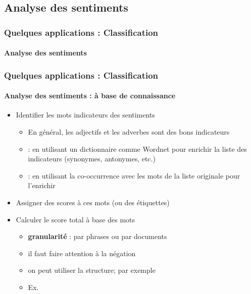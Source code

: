 \documentclass[xcolor=table]{beamer}
\begin{document}
\subsection{Analyse des sentiments}

\begin{frame}
	\frametitle{Quelques applications : Classification}
	\framesubtitle{Analyse des sentiments}
\end{frame}

\begin{frame}
	\frametitle{Quelques applications : Classification}
	\framesubtitle{Analyse des sentiments : à base de connaissance}
	
	\begin{itemize}
		\item Identifier les mots indicateurs des sentiments
		\begin{itemize}
			\item En général, les adjectifs et les adverbes sont des bons indicateurs
			\item {} : en utilisant un dictionnaire comme Wordnet pour enrichir la liste des indicateurs (synonymes, antonymes, etc.) 
			\item {} : en utilisant la co-occurrence avec les mots  de la liste originale pour l'enrichir 
		\end{itemize}
		\item Assigner des scores à ces mots (ou des étiquettes)
		\item Calculer le score total à  base des mots
		\begin{itemize}
			\item \textbf{granularité} : par phrases ou par documents 
			\item il faut faire attention à  la négation
			\item on peut utiliser la structure; par exemple 
			\item Ex. 
		\end{itemize}
	\end{itemize}
	
\end{frame}
\end{document}
